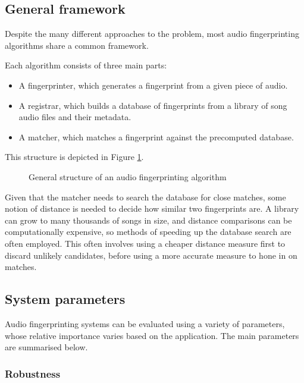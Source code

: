 \documentclass[12pt,a4paper,twoside,openright]{report}
\begin{document}
\subsection{General framework}

Despite the many different approaches to the problem, most audio fingerprinting algorithms share a common framework.

Each algorithm consists of three main parts: 

\begin{itemize}
  \item A fingerprinter, which generates a fingerprint from a given piece of audio.
  \item A registrar, which builds a database of fingerprints from a library of song audio files and their metadata.
  \item A matcher, which matches a fingerprint against the precomputed database.
\end{itemize}

This structure is depicted in Figure \ref{fig:generalframework}. 

\begin{figure}[ht]
  \centering
  
  \caption{General structure of an audio fingerprinting algorithm}
  \label{fig:generalframework}
\end{figure}

Given that the matcher needs to search the database for close matches, some notion of distance is needed to decide how similar two fingerprints are. A library can grow to many thousands of songs in size, and distance comparisons can be computationally expensive, so methods of speeding up the database search are often employed. This often involves using a cheaper distance measure first to discard unlikely candidates, before using a more accurate measure to hone in on matches.


\subsection{System parameters}
\label{section:systemparams}

Audio fingerprinting systems can be evaluated using a variety of parameters, whose relative importance varies based on the application. 
The main parameters are summarised below.

\subsubsection{Robustness}
\end{document}
